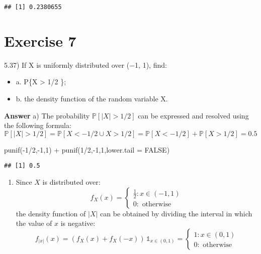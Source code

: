 \documentclass[
]{article}
\newenvironment{Shaded}{\begin{snugshade}}{\end{snugshade}}
\newcommand{\AttributeTok}[1]{\textcolor[rgb]{0.77,0.63,0.00}{#1}}
\newcommand{\ConstantTok}[1]{\textcolor[rgb]{0.00,0.00,0.00}{#1}}
\newcommand{\DecValTok}[1]{\textcolor[rgb]{0.00,0.00,0.81}{#1}}
\newcommand{\FunctionTok}[1]{\textcolor[rgb]{0.00,0.00,0.00}{#1}}
\newcommand{\NormalTok}[1]{#1}
\newcommand{\SpecialCharTok}[1]{\textcolor[rgb]{0.00,0.00,0.00}{#1}}
\providecommand{\tightlist}{%
  \setlength{\itemsep}{0pt}\setlength{\parskip}{0pt}}
\begin{document}
\begin{verbatim}
## [1] 0.2380655
\end{verbatim}

\hypertarget{exercise-7}{%
\section{Exercise 7}\label{exercise-7}}

5.37) If X is uniformly distributed over (−1, 1), find:

\begin{itemize}
\tightlist
\item
  a. P\{\textbar X\textbar{} \textgreater{} 1/2 \};
\item
  b. the density function of the random variable \textbar X\textbar.
\end{itemize}

\textbf{Answer} a) The probability \(\mathbb P[|X|>1/2]\) can be
expressed and resolved using the following formula:
\[\mathbb P[|X|>1/2]=\mathbb P[X<-1/2 \cup X>1/2]=\mathbb P[X<-1/2]+\mathbb P[X>1/2]=0.5\]

\begin{Shaded}
\begin{Highlighting}[]
\FunctionTok{punif}\NormalTok{(}\SpecialCharTok{{-}}\DecValTok{1}\SpecialCharTok{/}\DecValTok{2}\NormalTok{,}\SpecialCharTok{{-}}\DecValTok{1}\NormalTok{,}\DecValTok{1}\NormalTok{) }\SpecialCharTok{+} \FunctionTok{punif}\NormalTok{(}\DecValTok{1}\SpecialCharTok{/}\DecValTok{2}\NormalTok{,}\SpecialCharTok{{-}}\DecValTok{1}\NormalTok{,}\DecValTok{1}\NormalTok{,}\AttributeTok{lower.tail =} \ConstantTok{FALSE}\NormalTok{) }
\end{Highlighting}
\end{Shaded}

\begin{verbatim}
## [1] 0.5
\end{verbatim}

\begin{enumerate}
\def\labelenumi{\alph{enumi})}
\setcounter{enumi}{1}
\tightlist
\item
  Since \(X\) is distributed over: \[f_X(x)=\begin{cases} 
  \frac{1}{2}: x\in (-1,1)\\
  0:\text{ otherwise}
  \end{cases}
  \] the density function of \(|X|\) can be obtained by dividing the
  interval in which the value of \(x\) is negative:
  \[f_{|x|}(x)= (f_X(x)+f_X(-x)) \, \mathbb{1}_{x \in (0,1)}= \begin{cases} 
  1:x \in (0,1)\\
  0:\text{ otherwise}
  \end{cases}\]
\end{enumerate}
\end{document}
